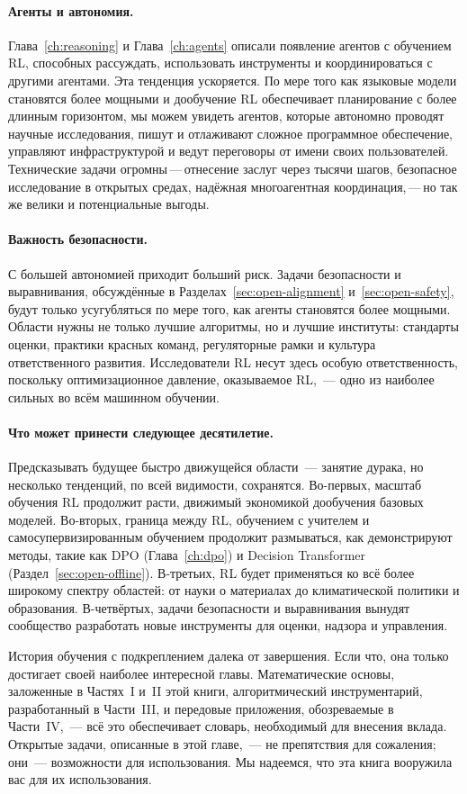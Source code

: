 \paragraph{Агенты и автономия.}
Глава~\ref{ch:reasoning} и Глава~\ref{ch:agents} описали
появление агентов с обучением RL, способных рассуждать, использовать инструменты и
координироваться с другими агентами. Эта тенденция ускоряется. По мере того как
языковые модели становятся более мощными и дообучение RL обеспечивает
планирование с более длинным горизонтом, мы можем увидеть агентов, которые автономно проводят
научные исследования, пишут и отлаживают сложное программное обеспечение, управляют
инфраструктурой и ведут переговоры от имени своих пользователей. Технические
задачи огромны\,---\,отнесение заслуг через
тысячи шагов, безопасное исследование в открытых средах,
надёжная многоагентная координация,\,---\,но так же велики и потенциальные
выгоды.

\paragraph{Важность безопасности.}
С большей автономией приходит больший риск. Задачи безопасности и выравнивания,
обсуждённые в Разделах~\ref{sec:open-alignment}
и~\ref{sec:open-safety}, будут только усугубляться по мере того, как агенты
становятся более мощными. Области нужны не только лучшие алгоритмы, но и
лучшие институты: стандарты оценки, практики красных команд,
регуляторные рамки и культура ответственного
развития. Исследователи RL несут здесь особую ответственность, поскольку
оптимизационное давление, оказываемое RL,~--- одно из наиболее сильных во
всём машинном обучении.

\paragraph{Что может принести следующее десятилетие.}
Предсказывать будущее быстро движущейся области~--- занятие дурака,
но несколько тенденций, по всей видимости, сохранятся. Во-первых, масштаб
обучения RL продолжит расти, движимый экономикой
дообучения базовых моделей. Во-вторых, граница между RL,
обучением с учителем и самосупервизированным обучением продолжит
размываться, как демонстрируют методы, такие как DPO (Глава~\ref{ch:dpo}) и Decision
Transformer (Раздел~\ref{sec:open-offline}). В-третьих, RL
будет применяться ко всё более широкому спектру областей: от науки о
материалах до климатической политики и образования. В-четвёртых, задачи
безопасности и выравнивания вынудят сообщество разработать новые инструменты для
оценки, надзора и управления.

История обучения с подкреплением далека от завершения. Если что, она
только достигает своей наиболее интересной главы. Математические
основы, заложенные в Частях~I и~II этой книги, алгоритмический
инструментарий, разработанный в Части~III, и передовые приложения, обозреваемые
в Части~IV,~--- всё это обеспечивает словарь, необходимый для внесения вклада. Открытые
задачи, описанные в этой главе,~--- не препятствия для сожаления;
они~--- возможности для использования. Мы надеемся, что эта книга вооружила вас
для их использования.
